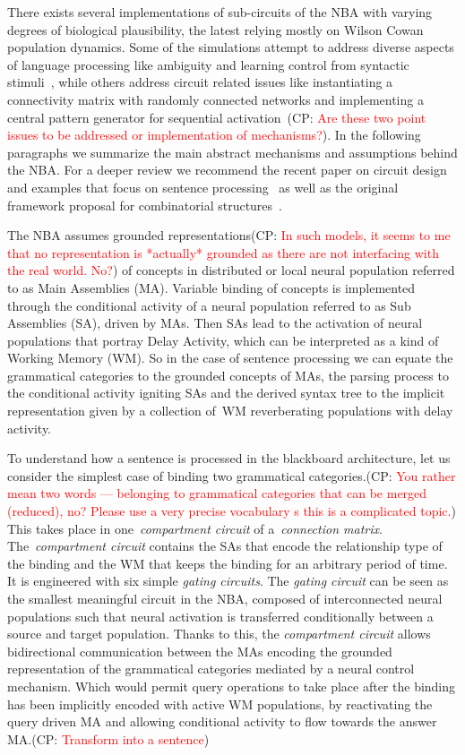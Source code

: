 \documentclass[10pt]{article}
\newcommand{\noteCP}[1]{(CP: \textcolor{red}{#1})}
\begin{document}
There exists several implementations of sub-circuits of the NBA with
varying degrees of biological plausibility, the latest relying mostly
on Wilson Cowan population dynamics\cite{Destexhe_2009}. Some of the
simulations attempt to address diverse aspects of language processing
like ambiguity\cite{Frank_2014} and learning control from syntactic
stimuli~\cite{van_der_Velde_2010}, while others address circuit
related issues like instantiating a connectivity matrix with randomly
connected networks\cite{van_der_Velde_2011} and implementing a central
pattern generator for sequential
activation~\cite{van_Dijk_2015}\noteCP{Are these two point issues to be
  addressed or implementation of mechanisms?}. In the following
paragraphs we summarize the main abstract mechanisms and
assumptions behind the NBA. For a deeper review we recommend the recent paper on circuit design and examples that focus on sentence
processing~\cite{de2015combinatorial} as well as the original framework
proposal for combinatorial structures~\cite{van_der_Velde_2006}.

The NBA assumes grounded representations\noteCP{In such models, it
  seems to me that no representation is *actually* grounded as there
  are not interfacing with the real world. No?} of concepts in
distributed or local neural population referred to as Main Assemblies
(MA). Variable binding of concepts is implemented through the
conditional activity of a neural population referred to as Sub
Assemblies (SA), driven by MAs. Then SAs lead to the activation of
neural populations that portray Delay Activity\cite{de_Kamps_2005},
which can be interpreted as a kind of Working Memory (WM). So in the case of
sentence processing we can equate the grammatical categories to the
grounded concepts of MAs, the parsing process to the conditional
activity igniting SAs and the derived syntax tree to the implicit
representation given by a collection of~WM reverberating populations
with delay activity.

To understand how a sentence is processed in the blackboard
architecture, let us consider the simplest case of binding two
grammatical categories.\noteCP{You rather mean two words --- belonging
  to grammatical categories that can be merged (reduced), no? Please
  use a very precise vocabulary s this is a complicated topic.} This takes place in
one~\emph{compartment circuit} of a~\emph{connection matrix}.
The~\emph{compartment circuit} contains the SAs that encode the
relationship type of the binding and the WM that keeps the binding for
an arbitrary period of time. It is engineered with six simple
\emph{gating circuits}. The \emph{gating circuit} can be seen as the
smallest meaningful circuit in the NBA, composed of interconnected
neural populations such that neural activation is transferred
conditionally between a source and target population. Thanks to this,
the \emph{compartment circuit} allows bidirectional communication
between the MAs encoding the grounded representation of the
grammatical categories mediated by a neural control mechanism. Which
would permit query operations to take place after the binding has been
implicitly encoded with active WM populations, by reactivating the
query driven MA and allowing conditional activity to flow towards the
answer MA.\noteCP{Transform into a sentence}
\end{document}
